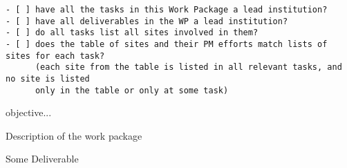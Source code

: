 \begin{draft}
\begin{verbatim}
- [ ] have all the tasks in this Work Package a lead institution?
- [ ] have all deliverables in the WP a lead institution?
- [ ] do all tasks list all sites involved in them?
- [ ] does the table of sites and their PM efforts match lists of sites for each task?
      (each site from the table is listed in all relevant tasks, and no site is listed
      only in the table or only at some task)
\end{verbatim}
\end{draft}

\begin{workpackage}[id=eosc,wphases=0-48,swsites,
  title=Services and EOSC Integration,short=EOSC,
  lead=SRL,
  SRLRM=16,
  UPSUDRM=4,
  XFELRM=4,
]
\begin{wpobjectives}
 \begin{compactitem}
   \item objective...
 \end{compactitem}
\end{wpobjectives}

\begin{wpdescription}

Description of the work package
\end{wpdescription}

\begin{tasklist}
% 

\end{tasklist}




\begin{wpdelivs}
\begin{wpdeliv}[due=1,miles=startup,id=infrastructure,dissem=PU,nature=DEC,lead=SRL]
  {Some Deliverable}
\end{wpdeliv}

\end{wpdelivs}
\end{workpackage}

